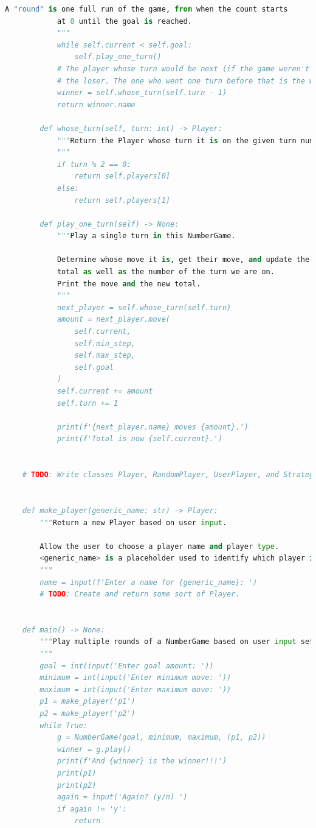\documentclass[12pt]{article}
\begin{document}
\begin{lstlisting}[language=Python,caption={lab3.py},captionpos=b]
            A "round" is one full run of the game, from when the count starts
            at 0 until the goal is reached.
            """
            while self.current < self.goal:
                self.play_one_turn()
            # The player whose turn would be next (if the game weren't over) is
            # the loser. The one who went one turn before that is the winner.
            winner = self.whose_turn(self.turn - 1)
            return winner.name

        def whose_turn(self, turn: int) -> Player:
            """Return the Player whose turn it is on the given turn number.
            """
            if turn % 2 == 0:
                return self.players[0]
            else:
                return self.players[1]

        def play_one_turn(self) -> None:
            """Play a single turn in this NumberGame.

            Determine whose move it is, get their move, and update the current
            total as well as the number of the turn we are on.
            Print the move and the new total.
            """
            next_player = self.whose_turn(self.turn)
            amount = next_player.move(
                self.current,
                self.min_step,
                self.max_step,
                self.goal
            )
            self.current += amount
            self.turn += 1

            print(f'{next_player.name} moves {amount}.')
            print(f'Total is now {self.current}.')


    # TODO: Write classes Player, RandomPlayer, UserPlayer, and StrategicPlayer.


    def make_player(generic_name: str) -> Player:
        """Return a new Player based on user input.

        Allow the user to choose a player name and player type.
        <generic_name> is a placeholder used to identify which player is being made.
        """
        name = input(f'Enter a name for {generic_name}: ')
        # TODO: Create and return some sort of Player.


    def main() -> None:
        """Play multiple rounds of a NumberGame based on user input settings.
        """
        goal = int(input('Enter goal amount: '))
        minimum = int(input('Enter minimum move: '))
        maximum = int(input('Enter maximum move: '))
        p1 = make_player('p1')
        p2 = make_player('p2')
        while True:
            g = NumberGame(goal, minimum, maximum, (p1, p2))
            winner = g.play()
            print(f'And {winner} is the winner!!!')
            print(p1)
            print(p2)
            again = input('Again? (y/n) ')
            if again != 'y':
                return



\end{lstlisting}
\end{document}
